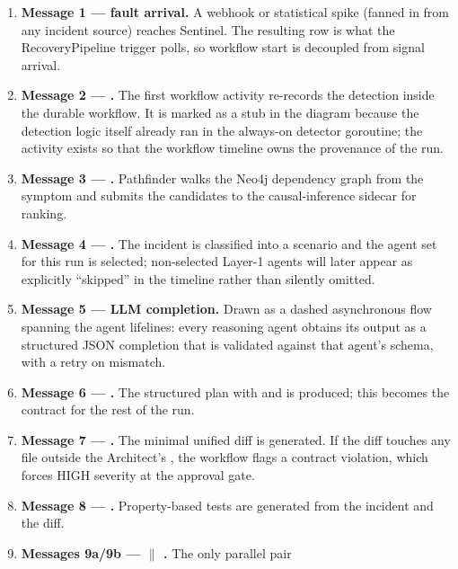 \begin{enumerate}[itemsep=2pt]
  \item \textbf{Message 1 --- fault arrival.} A webhook or statistical spike
        (fanned in from any incident source) reaches Sentinel. The resulting
         row is what the RecoveryPipeline trigger
        polls, so workflow start is decoupled from signal arrival.
  \item \textbf{Message 2 --- .} The first workflow
        activity re-records the detection inside the durable workflow. It is
        marked as a stub in the diagram because the detection logic itself
        already ran in the always-on detector goroutine; the activity exists
        so that the workflow timeline owns the provenance of the run.
  \item \textbf{Message 3 --- .} Pathfinder walks
        the Neo4j dependency graph from the symptom and submits the
        candidates to the causal-inference sidecar for ranking.
  \item \textbf{Message 4 --- .} The incident is
        classified into a scenario and the agent set for this run is
        selected; non-selected Layer-1 agents will later appear as
        explicitly ``skipped'' in the timeline rather than silently omitted.
  \item \textbf{Message 5 --- LLM completion.} Drawn as a dashed
        asynchronous flow spanning the agent lifelines: every reasoning
        agent obtains its output as a structured JSON completion that is
        validated against that agent's schema, with a retry on mismatch.
  \item \textbf{Message 6 --- .} The structured
        plan with  and  is produced;
        this becomes the contract for the rest of the run.
  \item \textbf{Message 7 --- .} The minimal unified
        diff is generated. If the diff touches any file outside the
        Architect's , the workflow flags a contract
        violation, which forces HIGH severity at the approval gate.
  \item \textbf{Message 8 --- .} Property-based tests are
        generated from the incident and the diff.
  \item \textbf{Messages 9a/9b --- 
        $\parallel$ .} The only parallel pair

\end{enumerate}
